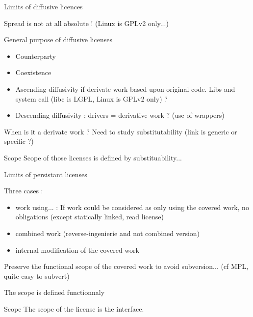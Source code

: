 \documentclass{beamer}
\begin{document}
\begin{frame}{Limits of diffusive licences}

Spread is not at all absolute ! (Linux is GPLv2 only...)

  \begin{block}{General purpose of diffusive licenses}
    \begin{itemize}
    \item Counterparty
    \item Coexistence
    \end{itemize}
  \end{block}

  \begin{itemize}
  \item Ascending diffusivity if derivate work based upon original code. Libs and system call (libc is LGPL, Linux is GPLv2 only) ? 
  \item Descending diffusivity : drivers = derivative work ? (use of wrappers)
  \end{itemize}

When is it a derivate work ? Need to study substitutability (link is generic or specific ?)

  \begin{alertblock}{Scope}
    Scope of those licenses is defined by substituability...
  \end{alertblock}
\end{frame}


\begin{frame}{Limits of persistant licenses}

Three cases :

  \begin{itemize}
  \item work using... : If work could be considered as only using the covered work, no obligations (except statically linked, read license)
  \item combined work (reverse-ingenierie and not combined version)
  \item internal modification of the covered work
  \end{itemize}

Preserve the functional scope of the covered work to avoid subversion... (cf MPL, quite easy to subvert)

The scope is defined functionnaly

 \begin{alertblock}{Scope}
 	The scope of the license is the interface.
  \end{alertblock}
  
\end{frame}
\end{document}
